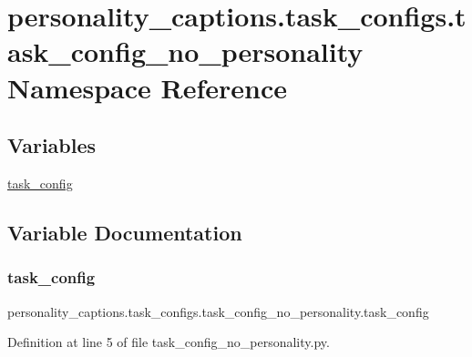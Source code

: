 \hypertarget{namespacepersonality__captions_1_1task__configs_1_1task__config__no__personality}{}\section{personality\+\_\+captions.\+task\+\_\+configs.\+task\+\_\+config\+\_\+no\+\_\+personality Namespace Reference}
\label{namespacepersonality__captions_1_1task__configs_1_1task__config__no__personality}
\subsection*{Variables}
\begin{DoxyCompactItemize}
\item 
\hyperlink{namespacepersonality__captions_1_1task__configs_1_1task__config__no__personality_af9ab661855b3f4aae3d77c8dc0894ffe}{task\+\_\+config}
\end{DoxyCompactItemize}


\subsection{Variable Documentation}
\mbox{\label{namespacepersonality__captions_1_1task__configs_1_1task__config__no__personality_af9ab661855b3f4aae3d77c8dc0894ffe}} 
\subsubsection{\texorpdfstring{task\+\_\+config}{task\_config}}
{\footnotesize\ttfamily personality\+\_\+captions.\+task\+\_\+configs.\+task\+\_\+config\+\_\+no\+\_\+personality.\+task\+\_\+config}



Definition at line 5 of file task\+\_\+config\+\_\+no\+\_\+personality.\+py.

